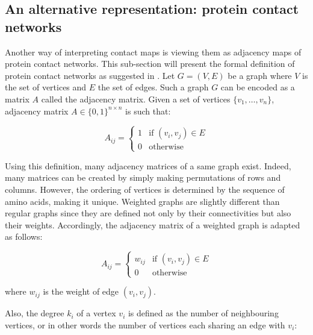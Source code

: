     \subsection{An alternative representation: protein contact networks} \label{pcn}

        Another way of interpreting contact maps is viewing them as adjacency maps of protein contact networks.
        This sub-section will present the formal definition of protein contact networks as suggested in \cite{doi:10.1021/cr3002356}.
        Let $G = (V, E)$ be a graph where $V$ is the set of vertices and $E$ the set of edges. Such a graph $G$ can be encoded as a matrix $A$ called
        the adjacency matrix. Given a set of vertices $\{ v_1, \ldots, v_n \}$, adjacency matrix $A \in \{ 0, 1 \}^{n \times n}$ is such that:

        \begin{equation}    
            A_{ij} =
                \begin{cases}
                    1 & \text{if } (v_i, v_j) \in E \\
                    0 & \text{otherwise}
                \end{cases}
        \end{equation}

        Using this definition, many adjacency matrices of a same graph exist. Indeed, many matrices can be created by simply
        making permutations of rows and columns. However, the ordering of vertices is determined by the sequence
        of amino acids, making it unique.
        Weighted graphs are slightly different than regular graphs since they are defined not only by their connectivities but also their weights.
        Accordingly, the adjacency matrix of a weighted graph is adapted as follows:

        \begin{equation}    
            A_{ij} =
                \begin{cases}
                    w_{ij} & \text{if } (v_i, v_j) \in E \\
                    0 & \text{otherwise}
                \end{cases}       
        \end{equation}

        where $w_{ij}$ is the weight of edge $(v_i, v_j)$.

        Also, the degree $k_i$ of a vertex $v_i$ is defined as the number of neighbouring vertices, or in other
        words the number of vertices each sharing an edge with $v_i$:

